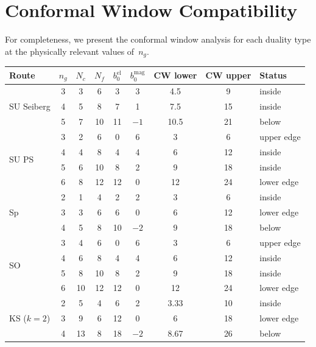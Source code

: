 \documentclass[11pt,a4paper]{article}
\theoremstyle{plain}
\theoremstyle{definition}
\theoremstyle{remark}
\newcommand{\Nc}{N_{\!c}}
\newcommand{\Nf}{N_{\!f}}
\newcommand{\ngen}{n_g}
\begin{document}
\section{Conformal Window Compatibility}
\label{sec:conformal-details}

For completeness, we present the conformal window analysis for each
duality type at the physically relevant values of~$\ngen$.

\begin{table}[h!]
\centering
\renewcommand{\arraystretch}{1.3}
\begin{tabular}{@{}l c c c c c c c l@{}}
\toprule
\textbf{Route} & $\ngen$ & $\Nc$ & $\Nf$ &
  $b_0^{\text{el}}$ & $b_0^{\text{mag}}$ & CW lower & CW upper &
  \textbf{Status} \\
\midrule
\multirow{3}{*}{SU Seiberg} & 3 & 3 & 6 & 3 & 3 & 4.5 & 9 & inside \\
  & 4 & 5 & 8 & 7 & 1 & 7.5 & 15 & inside \\
  & 5 & 7 & 10 & 11 & $-1$ & 10.5 & 21 & below \\
\midrule
\multirow{4}{*}{SU PS} & 3 & 2 & 6 & 0 & 6 & 3 & 6 & upper edge \\
  & 4 & 4 & 8 & 4 & 4 & 6 & 12 & inside \\
  & 5 & 6 & 10 & 8 & 2 & 9 & 18 & inside \\
  & 6 & 8 & 12 & 12 & 0 & 12 & 24 & lower edge \\
\midrule
\multirow{3}{*}{Sp} & 2 & 1 & 4 & 2 & 2 & 3 & 6 & inside \\
  & 3 & 3 & 6 & 6 & 0 & 6 & 12 & lower edge \\
  & 4 & 5 & 8 & 10 & $-2$ & 9 & 18 & below \\
\midrule
\multirow{4}{*}{SO} & 3 & 4 & 6 & 0 & 6 & 3 & 6 & upper edge \\
  & 4 & 6 & 8 & 4 & 4 & 6 & 12 & inside \\
  & 5 & 8 & 10 & 8 & 2 & 9 & 18 & inside \\
  & 6 & 10 & 12 & 12 & 0 & 12 & 24 & lower edge \\
\midrule
\multirow{3}{*}{KS ($k=2$)} & 2 & 5 & 4 & 6 & 2 & 3.33 & 10 & inside \\
  & 3 & 9 & 6 & 12 & 0 & 6 & 18 & lower edge \\
  & 4 & 13 & 8 & 18 & $-2$ & 8.67 & 26 & below \\
\bottomrule

\end{tabular}
\end{table}
\end{document}
